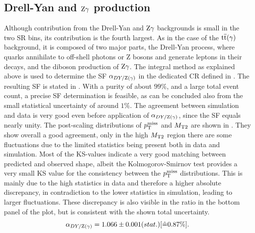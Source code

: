 \subsection{Drell-Yan and $\mathrm{Z}\gamma$ production}
Although contribution from the Drell-Yan and $\mathrm{Z}\gamma$ backgrounds is small in the two SR bins, its contribution is the fourth largest. As in the case of the ${\mathrm{t}\overline{\mathrm{t}}}(\gamma)$ background, it is composed of two major parts, the Drell-Yan process, where quarks annihilate to off-shell photons or Z bosons and generate leptons in their decays, and the diboson production of $\mathrm{Z}\gamma$. The integral method as explained above is used to determine the SF $\alpha_{DY/\mathrm{Z}(\gamma)}$ in the dedicated CR defined in .
The resulting SF is stated in . With a purity of about $99\%$, and a large total event count, a precise SF determination is feasible, as can be concluded also from the small statistical uncertainty of around $1\%$. The agreement between simulation and data is very good even before application of $\alpha_{DY/\mathrm{Z}(\gamma)}$, since the SF equals nearly unity. The post-scaling distributions of $p_{\mathrm{T}}^\text{miss}$ and $M_{\mathrm{T2}}$ are shown in . They show overall a good agreement, only in the high $M_{\mathrm{T2}}$ region there are some fluctuations due to the limited statistics being present both in data and simulation.
Most of the KS-values indicate a very good matching between predicted and observed shape, albeit the Kolmogorov-Smirnov test provides a very small KS value for the consistency between the $p_{\mathrm{T}}^\text{miss}$ distributions. This is mainly due to the high statistics in data and therefore a higher absolute discrepancy, in contradiction to the lower statistics in simulation, leading to larger fluctuations. These discrepancy is also visible in the ratio in the bottom panel of the plot, but is consistent with the shown total uncertainty.\\
%
\begin{equation}\label{eq:AlphaDY}
 \alpha_{DY/\mathrm{Z}(\gamma)}=1.066 \pm 0.001 (stat.) [\hat{=}0.87\%].
\end{equation}

